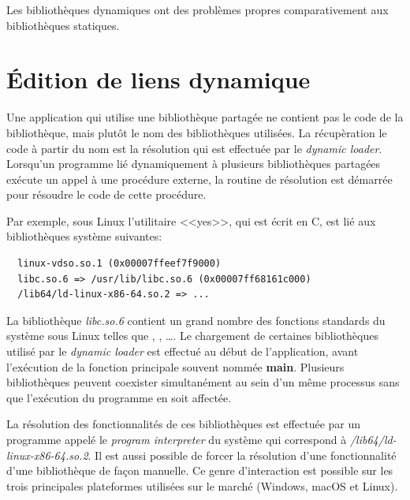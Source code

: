 Les bibliothèques dynamiques ont des problèmes propres comparativement aux
bibliothèques statiques.




\section{Édition de liens dynamique}

Une application qui utilise une bibliothèque partagée ne contient pas le code
de la bibliothèque, mais plutôt le nom des bibliothèques utilisées. La
récupèration le code à partir du nom est la résolution qui est effectuée par le
\textit{dynamic loader}.  Lorsqu'un programme lié dynamiquement à plusieurs
bibliothèques partagées exécute un appel à une procédure externe, la routine de
résolution est démarrée pour résoudre le code de cette procédure.

Par exemple, sous Linux l'utilitaire <<yes>>, qui est écrit en C,
est lié aux bibliothèques système suivantes:
\begin{verbatim}
  linux-vdso.so.1 (0x00007ffeef7f9000)
  libc.so.6 => /usr/lib/libc.so.6 (0x00007ff68161c000)
  /lib64/ld-linux-x86-64.so.2 => ...
\end{verbatim}

La bibliothèque \textit{libc.so.6} contient un grand nombre des fonctions
standards du système sous Linux telles que , ,
\dots.  Le chargement de certaines bibliothèques utilisé par le \textit{dynamic
loader} est effectué au début de l'application, avant l'exécution de la fonction
principale souvent nommée \textbf{main}.  Plusieurs bibliothèques peuvent
coexister simultanément au sein d'un même processus sans que l'exécution du
programme en soit affectée.

La résolution des fonctionnalités de ces bibliothèques est effectuée par un
programme appelé le \textit{program interpreter} du système qui correspond à
\textit{/lib64/ld-linux-x86-64.so.2}.  Il est aussi possible de forcer la
résolution d'une fonctionnalité d'une bibliothèque de façon manuelle. Ce genre
d'interaction est possible sur les trois principales plateformes utilisées sur
le marché (Windows, macOS et Linux).

